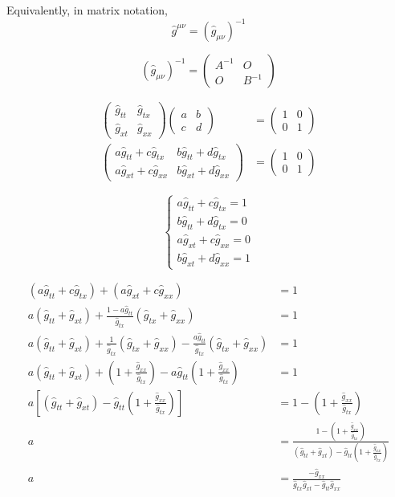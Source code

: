 \documentclass[english]{article}
\begin{document}
Equivalently, in matrix notation, 
\[
\hat{g}^{\mu\nu}=\left(\hat{g}_{\mu\nu}\right)^{-1}
\]

\[
\left(\hat{g}_{\mu\nu}\right)^{-1}=\begin{pmatrix}A^{-1} & O\\
O & B^{-1}
\end{pmatrix}
\]

\begin{align*}
\begin{pmatrix}\hat{g}_{tt} & \hat{g}_{tx}\\
\hat{g}_{xt} & \hat{g}_{xx}
\end{pmatrix}\begin{pmatrix}a & b\\
c & d
\end{pmatrix} & =\begin{pmatrix}1 & 0\\
0 & 1
\end{pmatrix}\\
\begin{pmatrix}a\hat{g}_{tt}+c\hat{g}_{tx} & b\hat{g}_{tt}+d\hat{g}_{tx}\\
a\hat{g}_{xt}+c\hat{g}_{xx} & b\hat{g}_{xt}+d\hat{g}_{xx}
\end{pmatrix} & =\begin{pmatrix}1 & 0\\
0 & 1
\end{pmatrix}
\end{align*}

\[
\begin{cases}
a\hat{g}_{tt}+c\hat{g}_{tx}=1\\
b\hat{g}_{tt}+d\hat{g}_{tx}=0\\
a\hat{g}_{xt}+c\hat{g}_{xx}=0\\
b\hat{g}_{xt}+d\hat{g}_{xx}=1
\end{cases}
\]

\begin{align*}
\left(a\hat{g}_{tt}+c\hat{g}_{tx}\right)+\left(a\hat{g}_{xt}+c\hat{g}_{xx}\right) & =1\\
a\left(\hat{g}_{tt}+\hat{g}_{xt}\right)+\frac{1-a\hat{g}_{tt}}{\hat{g}_{tx}}\left(\hat{g}_{tx}+\hat{g}_{xx}\right) & =1\\
a\left(\hat{g}_{tt}+\hat{g}_{xt}\right)+\frac{1}{\hat{g}_{tx}}\left(\hat{g}_{tx}+\hat{g}_{xx}\right)-\frac{a\hat{g}_{tt}}{\hat{g}_{tx}}\left(\hat{g}_{tx}+\hat{g}_{xx}\right) & =1\\
a\left(\hat{g}_{tt}+\hat{g}_{xt}\right)+\left(1+\frac{\hat{g}_{xx}}{\hat{g}_{tx}}\right)-a\hat{g}_{tt}\left(1+\frac{\hat{g}_{xx}}{\hat{g}_{tx}}\right) & =1\\
a\left[\left(\hat{g}_{tt}+\hat{g}_{xt}\right)-\hat{g}_{tt}\left(1+\frac{\hat{g}_{xx}}{\hat{g}_{tx}}\right)\right] & =1-\left(1+\frac{\hat{g}_{xx}}{\hat{g}_{tx}}\right)\\
a & =\frac{1-\left(1+\frac{\hat{g}_{xx}}{\hat{g}_{tx}}\right)}{\left(\hat{g}_{tt}+\hat{g}_{xt}\right)-\hat{g}_{tt}\left(1+\frac{\hat{g}_{xx}}{\hat{g}_{tx}}\right)}\\
a & =\frac{-\hat{g}_{xx}}{\hat{g}_{tx}\hat{g}_{xt}-\hat{g}_{tt}\hat{g}_{xx}}
\end{align*}
\end{document}
